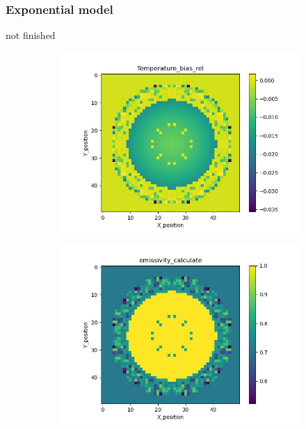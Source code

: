 \subsubsection{Exponential model}
not finished
\begin{figure}[htbp]
    \centering
    \begin{minipage}{\textwidth}
        \centering
        \begin{subfigure}{0.49\textwidth}
            \centering
            \includegraphics[width=\textwidth]{figures/raw_data/0/mix/T_bias.jpg}
        \end{subfigure}
        \begin{subfigure}{0.49\textwidth}
            \centering
            \includegraphics[width=\textwidth]{figures/raw_data/0/mix/emi_cal.jpg}

\end{subfigure}
\end{minipage}
\end{figure}

